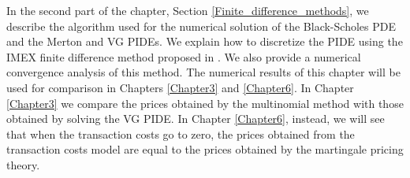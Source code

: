 In the second part of the chapter, Section \ref{Finite_difference_methods}, we describe the algorithm used for the numerical solution of the Black-Scholes PDE and the
Merton and VG PIDEs.
We explain how to discretize the PIDE using the IMEX finite difference method proposed in \cite{CoVo05b}. We also provide a numerical convergence analysis of this method.
The numerical results of this chapter will be used for comparison in Chapters \ref{Chapter3} and \ref{Chapter6}.
In Chapter \ref{Chapter3} we compare the prices obtained by the multinomial method with those obtained by solving the VG PIDE.  
In Chapter \ref{Chapter6}, instead, we will see that when the transaction costs go to zero, 
the prices obtained from the transaction costs model are equal to the prices obtained by the martingale pricing theory.

